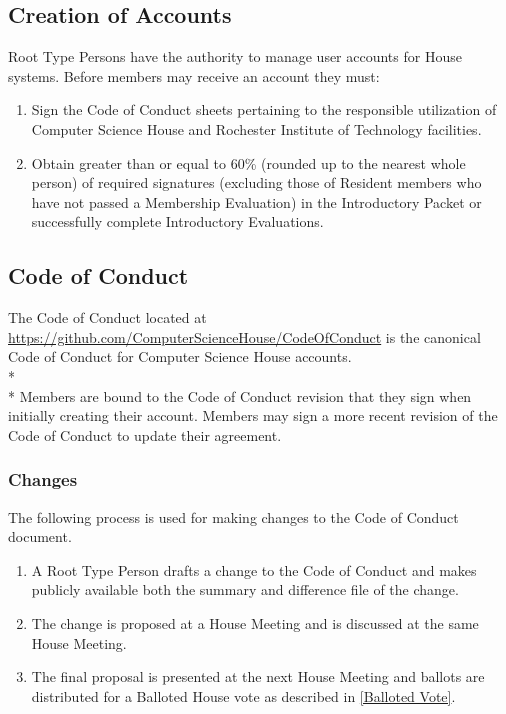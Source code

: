 \documentclass{article}
\newcommand{\bsection}[1]{\subsection{#1} \label{#1}}
\newcommand{\bsubsection}[1]{\subsubsection{#1} \label{#1}}
\begin{document}
\bsection{Creation of Accounts}
Root Type Persons have the authority to manage user accounts for House systems.
Before members may receive an account they must:
\renewcommand{\theenumi}{\alph{enumi}} %
\begin{enumerate}
	\item Sign the Code of Conduct sheets pertaining to the responsible utilization of Computer Science House and Rochester Institute of Technology facilities.
	\item Obtain greater than or equal to 60\% (rounded up to the nearest whole person) of required signatures (excluding those of Resident members who have not passed a Membership Evaluation) in the Introductory Packet or successfully complete Introductory Evaluations.
\end{enumerate}

\bsection{Code of Conduct}
The Code of Conduct located at \url{https://github.com/ComputerScienceHouse/CodeOfConduct} is the canonical Code of Conduct for Computer Science House accounts.
\\* \\*
Members are bound to the Code of Conduct revision that they sign when initially creating their account.
Members may sign a more recent revision of the Code of Conduct to update their agreement.
\bsubsection{Changes}
The following process is used for making changes to the Code of Conduct document.
\begin{enumerate}
	\item A Root Type Person drafts a change to the Code of Conduct and makes publicly available both the summary and difference file of the change.
	\item The change is proposed at a House Meeting and is discussed at the same House Meeting.
	\item The final proposal is presented at the next House Meeting and ballots are distributed for a Balloted House vote as described in \ref{Balloted Vote}.
\end{enumerate}
\end{document}

